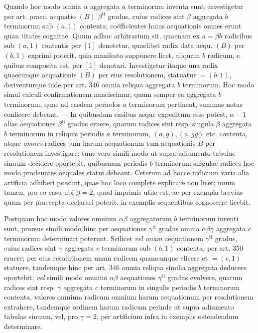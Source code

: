 Quando hoc modo omnia \(\alpha\) aggregata \(a\) terminorum inventa sunt, investigetur per art. praec. aequatio \((B)\) \(\beta^{\mathrm{ti}}\) gradus, cuius radices sint \(\beta\) aggregata \(b\) terminorum sub \((a,1)\) contenta; coëfficientes huius aequationis omnes erunt quan%
titates cognitae. Quum adhuc arbitrarium sit, quaenam ex \(a=\beta b\) radicibus sub \((a,1)\) contentis per \([1]\) denotetur, quaelibet radix data aequ. \((B)\) per \((b,1)\) exprimi poterit, quia manifesto supponere licet, aliquam \(b\) radicum, e quibus composita est, per \([1]\) denotari. Investigetur itaque una radix quaecunque aequationis \((B)\) per eius resolutionem, statuatur \(=(b,1)\), deriventurque inde per art. 346 omnia reliqua aggregata \(b\) terminorum. Hoc modo simul calculi confirmationem nanciscimur, quum semper ea aggregata \(b\) terminorum, quae ad easdem periodos \(a\) terminorum pertinent, summas notas conficere debeant. — In quibusdam casibus aeque expeditum esse potest, \(\alpha-1\) alias aequationes \(\beta^{\mathrm{ti}}\) gradus eruere, quarum radices sint resp. singula \(\beta\) aggregata \(b\) terminorum in reliquis periodis \(a\) terminorum, \((a,g),\allowbreak (a,gg)\) etc. contenta, atque \textit{omnes} radices tum harum aequationum tum aequationis \(B\) per resolutionem investigare: tunc vero simili modo ut supra adiumento tabulae sinuum decidere oportebit, quibusnam periodis \(b\) terminorum singulae radices hoc modo prodeuntes aequales statui debeant. Ceterum ad hocce iudicium varia alia artificia adhiberi possunt, quae hoc loco complete explicare non licet; unum tamen, pro eo casu ubi \(\beta=2\), quod imprimis utile est, ac per exempla brevius quam per praecepta declarari poterit, in exemplis sequentibus cognoscere licebit.

Postquam hoc modo valores omnium \(\alpha\beta\) aggregatorum \(b\) terminorum inventi sunt, prorsus simili modo hinc per aequationes \(\gamma^{\mathrm{ti}}\) gradus omnia \(\alpha\beta\gamma\) aggregata \(c\) terminorum determinari poterunt. Scilicet \textit{vel unam} aequationem \(\gamma^{\mathrm{ti}}\) gradus, cuius radices sint \(\gamma\) aggregata \(c\) terminorum sub \((b,1)\) contenta, per art. 350 eruere; per eius resolutionem unam radicem quamcunque elicere et \(=(c,1)\) statuere, tandemque hinc per art. 346 omnia reliqua similia aggregata deducere oportebit; \textit{vel} simili modo omnino \(\alpha\beta\) aequationes \(\gamma^{\mathrm{ti}}\) gradus evolvere, quarum radices sint resp. \(\gamma\) aggregata \(c\) terminorum in singulis periodis \(b\) terminorum contenta, valores omnium radicum omnium harum aequationum per resolutionem extrahere, tandemque ordinem harum radicum perinde ut supra adiumento tabulae sinuum, vel, pro \(\gamma=2\), per artificium infra in exemplis ostendendum determinare.

